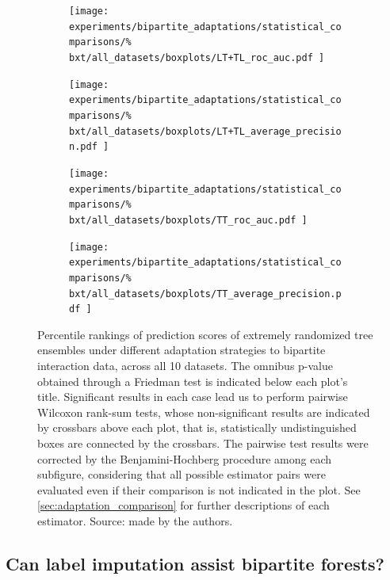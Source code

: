\begin{figure}[tbh]
    \centering
    \begin{subfigure}{0.49\textwidth}
        \texttt{[image: 
            experiments/bipartite\_adaptations/statistical\_comparisons/\%
            bxt/all\_datasets/boxplots/LT+TL\_roc\_auc.pdf
        ]}
    \end{subfigure}
    \begin{subfigure}{0.49\textwidth}
        \texttt{[image: 
            experiments/bipartite\_adaptations/statistical\_comparisons/\%
            bxt/all\_datasets/boxplots/LT+TL\_average\_precision.pdf
        ]}
    \end{subfigure}

    \begin{subfigure}{0.49\textwidth}
        \texttt{[image: 
            experiments/bipartite\_adaptations/statistical\_comparisons/\%
            bxt/all\_datasets/boxplots/TT\_roc\_auc.pdf
        ]}
    \end{subfigure}
    \begin{subfigure}{0.49\textwidth}
        \texttt{[image: 
            experiments/bipartite\_adaptations/statistical\_comparisons/\%
            bxt/all\_datasets/boxplots/TT\_average\_precision.pdf
        ]}
    \end{subfigure}
    \caption{
        Percentile rankings of prediction scores of extremely randomized tree ensembles under different adaptation strategies to bipartite interaction data, across all 10 datasets.
        The omnibus p-value obtained through a Friedman test is indicated below each plot's title. Significant results in each case lead us to perform pairwise Wilcoxon rank-sum tests, whose non-significant results are indicated by crossbars above each plot, that is, statistically undistinguished boxes are connected by the crossbars. The pairwise test results were corrected by the Benjamini-Hochberg procedure among each subfigure, considering that all possible estimator pairs were evaluated even if their comparison is not indicated in the plot. See \autoref{sec:adaptation_comparison} for further descriptions of each estimator. Source: made by the authors.
    }
    \label{fig:adaptations_bxt}
\end{figure}


\subsection{Can label imputation assist bipartite forests?}
\label{sec:y_reconstruction}

